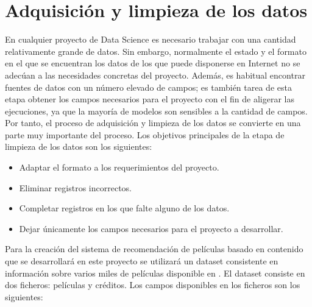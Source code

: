 
\chapter{Adquisición y limpieza de los datos}\label{chap:adq}

En cualquier proyecto de Data Science es necesario trabajar con una cantidad relativamente grande de datos. Sin embargo, normalmente el estado y el formato en el que se encuentran los datos de los que puede disponerse en Internet no se adecúan a las necesidades concretas del proyecto. Además, es habitual encontrar fuentes de datos con un número elevado de campos; es también tarea de esta etapa obtener los campos necesarios para el proyecto con el fin de aligerar las ejecuciones, ya que la mayoría de modelos son sensibles a la cantidad de campos. Por tanto, el proceso de adquisición y limpieza de los datos se convierte en una parte muy importante del proceso. Los objetivos principales de la etapa de limpieza de los datos son los siguientes:
\begin{itemize}
    \item Adaptar el formato a los requerimientos del proyecto.
    \item Eliminar registros incorrectos.
    \item Completar registros en los que falte alguno de los datos.
    \item Dejar únicamente los campos necesarios para el proyecto a desarrollar.
\end{itemize}

Para la creación del sistema de recomendación de películas basado en contenido que se desarrollará en este proyecto se utilizará un dataset consistente en información sobre varios miles de películas disponible en \cite{kaggle}. El dataset consiste en dos ficheros: películas y créditos. Los campos disponibles en los ficheros son los siguientes:

